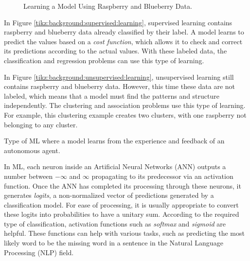 \begin{figure}[!ht]
\begin{minipage}{.45\textwidth}
    \label{tikz:background:unsupervised:learning}
  \end{minipage}
  \caption{Learning a Model Using Raspberry and Blueberry Data.}
  \label{fig:background:supervised:vs:unsupervised}
\end{figure}

In Figure \ref{tikz:background:supervised:learning}, supervised learning
contains raspberry and blueberry data already classified by their label. A model
learns to predict the values based on a \emph{cost function}, which allows it to
check and correct its predictions according to the actual values. With these
labeled data, the classification and regression problems can use this type of
learning.

In Figure \ref{tikz:background:unsupervised:learning}, unsupervised learning
still contains raspberry and blueberry data. However, this time these data are
not labeled, which means that a model must find the patterns and structure
independently. The clustering and association problems use this type of
learning. For example, this clustering example creates two clusters, with one
raspberry not belonging to any cluster.


\begin{definition}
  Type of ML where a model learns from the experience and feedback of an
  autonomous agent.
\end{definition}

\noindent In ML, each neuron inside an Artificial Neural Networks (ANN) outputs
a number between $-\infty$ and $\infty$ propagating to its predecessor via an
activation function. Once the ANN has completed its processing through these
neurons, it generates \emph{logits}, a non-normalized vector of predictions
generated by a classification model. For ease of processing, it is usually
appropriate to convert these logits into probabilities to have a unitary
sum. According to the required type of classification, activation functions such
as \emph{softmax} and \emph{sigmoid} are helpful. These functions can help with
various tasks, such as predicting the most likely word to be the missing word in
a sentence in the Natural Language Processing (NLP) field.


